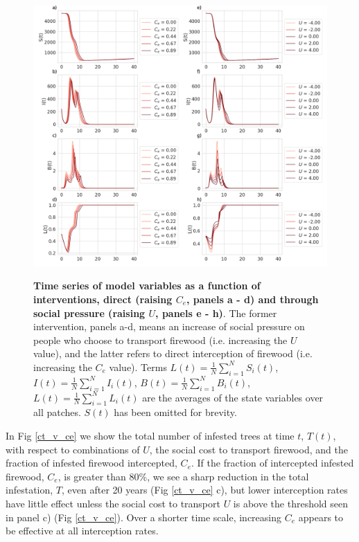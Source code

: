  \begin{figure}[!h]
\includegraphics[width = \textwidth]{chapter_2/timeseries.png}
\caption{\textbf{Time series of model variables as a function of interventions, direct (raising $C_e$, panels a - d) and through social pressure (raising $U$, panels e - h)}. The former intervention, panels a-d, means an increase of social pressure on people who choose to transport firewood (i.e. increasing the $U$ value), and the latter refers to direct interception of firewood (i.e. increasing the $C_e$ value). Terms $L(t) = \frac{1}{N} \sum_{i = 1}^N S_i(t)$, $I(t) = \frac{1}{N} \sum_{i = 1}^N I_i(t)$, $B(t) = \frac{1}{N} \sum_{i = 1}^N B_i(t)$, $L(t) = \frac{1}{N} \sum_{i = 1}^N L_i(t)$ are the averages of the state variables over all patches. $S(t)$ has been omitted for brevity.}
\protect \label{ts}
\end{figure}

In Fig \ref{ct_v_ce} we show the total number of infested trees at time $t$, $T(t)$, with respect to combinations of $U$, the social cost to transport firewood, and the fraction of infested firewood intercepted, $C_e$. If the fraction of intercepted infested firewood, $C_e$, is greater than 80\%, we see a sharp reduction in the total infestation, $T$, even after 20 years (Fig \ref{ct_v_ce} c), but lower interception rates have little effect unless the social cost to transport $U$ is above the threshold seen in panel c) (Fig \ref{ct_v_ce}). Over a shorter time scale, increasing $C_e$ appears to be effective at all interception rates. 


